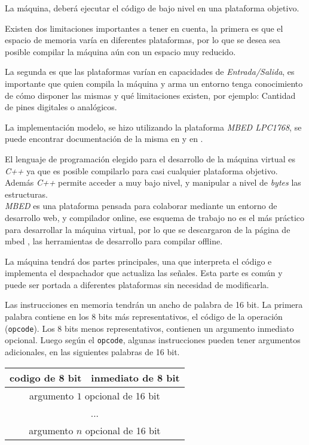   La máquina, deberá ejecutar el código de bajo nivel en una plataforma
  objetivo.

  Existen dos limitaciones importantes a tener en cuenta, la primera es que
el espacio de memoria varía en diferentes plataformas, por lo que se desea
sea posible compilar la máquina aún con un espacio muy reducido.

  La segunda es que las plataformas varían en capacidades
de \textit{Entrada/Salida}, es importante que quien compila la máquina y
arma un entorno tenga conocimiento de cómo disponer las mismas y qué
limitaciones existen, por ejemplo: Cantidad de pines digitales o analógicos.

  La implementación modelo, se hizo utilizando
  la plataforma \textit{MBED LPC1768},
se puede encontrar documentación de la misma en \cite{mbed-LPC1768} 
y en \cite{mbed}.

  El lenguaje de programación elegido para el desarrollo de la máquina virtual
es \textit{C++} ya que es posible compilarlo para casi cualquier plataforma
objetivo.
  Además \textit{C++} permite acceder a muy bajo nivel, y manipular a
nivel de \emph{bytes} las estructuras.\\

  \textit{MBED} es una plataforma pensada para colaborar mediante
un entorno de desarrollo web, y compilador online, ese esquema de 
trabajo no es el más práctico para desarrollar la máquina virtual, por
lo que se descargaron de la página de mbed \cite{mbeddev}, las herramientas
de desarrollo para compilar offline.

  La máquina tendrá dos partes principales, una que interpreta el código e
implementa el despachador que actualiza las señales.
  Esta parte es común y puede ser portada a diferentes plataformas sin
necesidad de modificarla.

  Las instrucciones en memoria tendrán un ancho de palabra de 16 bit.
  La primera palabra contiene en los 8 bits más representativos, el código
  de la operación (\texttt{opcode}).
  Los 8 bits menos representativos, contienen un argumento inmediato
  opcional.
  Luego según el \texttt{opcode}, algunas instrucciones pueden tener
  argumentos adicionales, en las siguientes palabras de 16 bit.

  \begin{center}
      \begin{tabular}{|c|c|}
      \hline
      codigo de 8 bit & \cellcolor{gray!25}inmediato de 8 bit \\
      \hline
      \multicolumn{2}{|c|}{argumento $1$ opcional de 16 bit} \\
      \hline
      \multicolumn{2}{|c|}{...} \\
      \hline
      \multicolumn{2}{|c|}{argumento $n$ opcional de 16 bit} \\
      \hline
      \end{tabular}
  \end{center}

